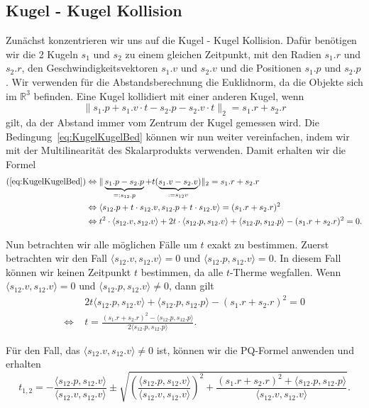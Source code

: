 \documentclass[a4paper, 10pt, openright, parskip, chapterprefix]{scrreprt}
\begin{document}
\subsection{Kugel - Kugel Kollision}
\noindent Zunächst konzentrieren wir uns auf die Kugel - Kugel Kollision. Dafür benötigen wir die 2 Kugeln 
$s_1$ und $s_2$ zu einem gleichen Zeitpunkt, mit den Radien $s_1.r$ und $s_2.r$, den Geschwindigkeitsvektoren
$s_1.v$ und $s_2.v$ und die Positionen $s_1.p$ und $s_2.p$. Wir verwenden für die Abstandsberechnung die
Euklidnorm, da die Objekte sich im $\mathbb{R}^{3}$ befinden. Eine Kugel kollidiert mit einer anderen
Kugel, wenn 
\begin{equation}
    \label{eq:KugelKugelBed}
    \|s_1.p + s_1.v \cdot t - s_2.p - s_2.v \cdot t \|_{2} = s_1.r + s_2.r
\end{equation}
gilt, da der Abstand immer vom Zentrum der Kugel gemessen wird.
Die Bedingung~\ref{eq:KugelKugelBed} können wir nun weiter vereinfachen, indem wir mit der Multilinearität des Skalarprodukts verwenden. Damit erhalten wir die Formel 
\begin{align*}
(\ref{eq:KugelKugelBed})  &\Leftrightarrow \|\underbrace{s_1.p - s_2.p}_{=: s_{12}.p} + t (\underbrace{s_1.v - s_2.v}_{:=s_{12}v})\|_{2}  = s_1.r + s_2.r\\
&\Leftrightarrow \langle s_{12}.p + t \cdot s_{12}.v, s_{12}.p + t \cdot s_{12}.v\rangle = (s_1.r + s_2.r)^{2}\\
&\Leftrightarrow t^{2} \cdot \langle s_{12}.v, s_{12}.v\rangle + 2t \cdot \langle s_{12}.p, s_{12}.v\rangle + \langle s_{12}.p, s_{12}.p\rangle -(s_1.r+s_2.r)^{2} = 0 \text{.}
\end{align*}

\noindent Nun betrachten wir alle möglichen Fälle um $t$ exakt zu bestimmen. Zuerst betrachten wir den Fall $\langle s_{12}.v, s_{12}.v \rangle = 0$ und $\langle s_{12}.p, s_{12}.v \rangle = 0$. In diesem Fall können wir keinen Zeitpunkt $t$ bestimmen, da alle $t$-Therme wegfallen. Wenn
$\langle s_{12}.v, s_{12}.v \rangle = 0$ und $\langle s_{12}.p, s_{12}.v\rangle \not= 0$, dann gilt
\begin{align*}
&2t \langle s_{12}.p, s_{12}.v\rangle + \langle s_{12}.p, s_{12}.p \rangle - (s_{1}.r + s_{2}.r)^{2} = 0 \\
\Leftrightarrow \; &t  = \frac{(s_{1}.r + s_{2}.r)^{2} - \langle s_{12}.p, s_{12}.p \rangle}{2 \langle s_{12}.p, s_{12}.p\rangle}\text{.}
\end{align*}

\noindent  Für den Fall, das $\langle s_{12}.v, s_{12}.v \rangle \not= 0$ ist, können wir die PQ-Formel anwenden und erhalten
\begin{equation*}
t_{1, 2} = -\frac{\langle s_{12}.p, s_{12}.v\rangle}{\langle s_{12}.v, s_{12}.v \rangle} \pm \sqrt{ \left( \frac{\langle s_{12}.p, s_{12}.v\rangle}{\langle s_{12}.v, s_{12}.v \rangle} \right)^{2} + \frac{(s_{1}.r + s_{2}.r)^{2} + \langle s_{12}.p, s_{12}.p\rangle}{\langle s_{12}.v, s_{12}.v \rangle}}\text{.}
\end{equation*}
\end{document}
